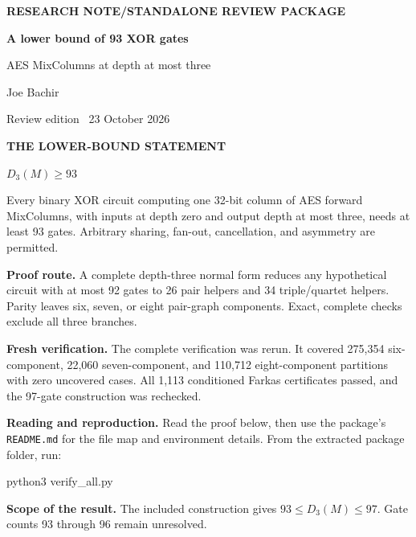 \documentclass[11pt,letterpaper]{article}
\begin{document}
\thispagestyle{plain}
\vspace*{-3pt}
{\sffamily\small\bfseries\color{accent} RESEARCH NOTE\quad /\quad STANDALONE REVIEW PACKAGE}\par
\vspace{10pt}
{\sffamily\fontsize{25}{30}\selectfont\bfseries\color{ink} A lower bound of 93 XOR gates}\par
\vspace{6pt}
{\sffamily\large\color{muted} AES MixColumns at depth at most three}\par
\vspace{11pt}
{\large Joe Bachir}\par
{\sffamily\small\color{muted} Review edition \textbullet\ 23 October 2026}\par
\begin{statementbox}
{\sffamily\bfseries\color{accent} THE LOWER-BOUND STATEMENT}\par
\vspace{3pt}
{\Large $D_3(M)\ge 93$}\par
Every binary XOR circuit computing one 32-bit column of AES forward MixColumns, with inputs at depth zero and output depth at most three, needs at least 93 gates. Arbitrary sharing, fan-out, cancellation, and asymmetry are permitted.
\end{statementbox}
\textbf{Proof route.} A complete depth-three normal form reduces any hypothetical circuit with at most 92 gates to 26 pair helpers and 34 triple/quartet helpers. Parity leaves six, seven, or eight pair-graph components. Exact, complete checks exclude all three branches.\par
\textbf{Fresh verification.} The complete verification was rerun. It covered 275,354 six-component, 22,060 seven-component, and 110,712 eight-component partitions with zero uncovered cases. All 1,113 conditioned Farkas certificates passed, and the 97-gate construction was rechecked.\par
\textbf{Reading and reproduction.} Read the proof below, then use the package's \texttt{README.md} for the file map and environment details. From the extracted package folder, run:\par
\vspace{3pt}
{\ttfamily\small python3 verify\_all.py}\par
\vspace{6pt}
\textbf{Scope of the result.} The included construction gives $93\le D_3(M)\le97$. Gate counts 93 through 96 remain unresolved.\par
\end{document}
